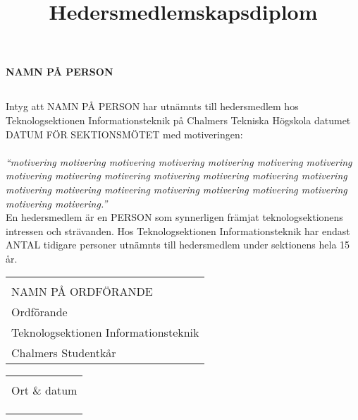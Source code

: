 \documentclass[11pt, noincludeaddress, nopagination]{classes/cthit}
\makeatletter
\newcommand{\sign}[4]{%
  \begin{tabular}[t]{@{}l@{}}
  \makebox[6.5cm]{\dotfill}\\
  \strut#1\strut \\
  \strut#2\strut \\
  \strut#3\strut \\
  \strut#4\strut \\
  \end{tabular}%
}
\makeatother
\begin{document}
\title{Hedersmedlemskapsdiplom}

\makeheadfoot%

\makesimpletitle
\begin{center}
\textbf{\Huge{NAMN PÅ PERSON}}
\end{center}
\vspace{1cm}
\subsection*{}
Intyg att NAMN PÅ PERSON har utnämnts till hedersmedlem hos Teknologsektionen Informationsteknik på Chalmers Tekniska Högskola datumet DATUM FÖR SEKTIONSMÖTET med motiveringen: 
\\
\\
\textit{
``motivering motivering motivering motivering motivering motivering motivering motivering motivering motivering motivering motivering motivering motivering motivering motivering motivering motivering motivering motivering motivering motivering motivering.''
}
\\

En hedersmedlem är en PERSON som synnerligen främjat teknologsektionens intressen och strävanden. Hos Teknologsektionen Informationsteknik har endast ANTAL tidigare personer utnämnts till hedersmedlem under sektionens hela 15 år.

\vspace{4cm} 

\noindent
  \begin{minipage}[t]{0.5\linewidth}
    \raggedright
    \sign{NAMN PÅ ORDFÖRANDE}{Ordförande}{Teknologsektionen Informationsteknik}{Chalmers Studentkår}
  \end{minipage}%
  \hfill
  \begin{minipage}[t]{0.5\linewidth}
  \sign{Ort \& datum}{}{}{}
  \end{minipage}
\end{document}
